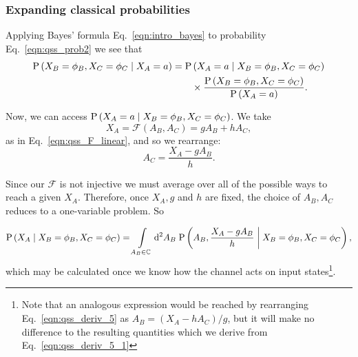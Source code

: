 




\subsubsection{Expanding classical probabilities}

Applying Bayes' formula Eq.~\ref{eqn:intro_bayes} to probability Eq.~\ref{eqn:qss_prob2} we see that
\begin{align}
\text{P}\left(X_B=\phi_B, X_C=\phi_C \; \middle| \; X_A=a\right) = \text{P}&\left(X_A=a \; \middle| \; X_B=\phi_B, X_C=\phi_C\right) \notag \\
&\times \frac{\text{P}\left(X_B=\phi_B, X_C=\phi_C\right)}{\text{P}\left(X_A=a\right)}.
\end{align}


\noindent Now, we can access $\text{P}\left(X_A=a \; \middle| \; X_B=\phi_B, X_C=\phi_C\right)$. 
We take
\begin{equation}\label{eqn:qss_deriv_5}
X_A = \mathcal{F}\left(A_B, A_C\right) = g A_B + h A_C,
\end{equation}
as in Eq.~\ref{eqn:qss_F_linear}, and so we rearrange:
\begin{equation}
A_C = \frac{X_A - g A_B}{h}.
\end{equation}

\noindent Since our $\mathcal{F}$ is not injective %
we must average over all of the possible ways to reach a given $X_A$. Therefore, once $X_A, g$ and $h$ are fixed, the choice of $A_B, A_C$ reduces to a one-variable problem. So

\begin{equation}\label{eqn:qss_deriv_5_1}
\text{P}\left(X_A \; \middle| \; X_B=\phi_B, X_C=\phi_C\right) = \int\limits_{A_B \in \mathbb{C}} \mathop{}\!\mathrm{d^2} A_B \; \text{P}\left(A_B , \frac{X_A - g A_B}{h} \; \middle| \; X_B=\phi_B, X_C=\phi_C\right),
\end{equation}
which may be calculated once we know how the channel acts on input states\footnote{Note that an analogous expression would be reached by rearranging Eq.~\ref{eqn:qss_deriv_5} as $A_B = \left(X_A - h A_C\right)/g$, but it will make no difference to the resulting quantities which we derive from Eq.~\ref{eqn:qss_deriv_5_1}}.

